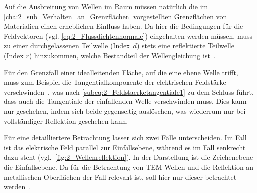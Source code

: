 Auf die Ausbreitung von Wellen im Raum müssen natürlich die im \Abschnitt\ref{cha:2_sub_Verhalten_an_Grenzflächen} vorgestellten Grenzflächen von Materialien einen erheblichen Einfluss haben. Da hier die Bedingungen für die Feldvektoren (vgl. \Gleichungen\eqref{eq:2_Flussdichtennormale}) eingehalten werden müssen, muss zu einer durchgelassenen Teilwelle \mbox{(Index \glqq$d$\grqq)} stets eine reflektierte Teilwelle (Index \glqq$r$\grqq) hinzukommen, welche Bestandteil der Wellengleichung ist~\cite{EM_Schirmung}.
\par
\vspace{\linespace}
Für den Grenzfall einer idealleitenden Fläche, auf die eine ebene Welle trifft, muss zum Beispiel die Tangentialkomponente der elektrischen Feldstärke verschwinden~\cite{EM_Schirmung}, was nach \Gleichung \eqref{subeq:2_Feldstaerketangentiale1} zu dem Schluss führt, dass auch die Tangentiale der einfallenden Welle verschwinden muss. Dies kann nur geschehen, indem sich beide gegenseitig auslöschen, was wiederrum nur bei vollständiger Reflektion geschehen kann.
\par
\vspace{\linespace}
Für eine detailliertere Betrachtung lassen sich zwei Fälle unterscheiden. Im Fall  ist das elektrische Feld parallel zur Einfallsebene, während es im Fall  senkrecht dazu steht (vgl.~\Abb \ref{fig:2_Wellenreflektion}). In der Darstellung ist die Zeichenebene die Einfallsebene. Da für die Betrachtung von TEM-Wellen und die Reflektion an metallischen Oberflächen der Fall  relevant ist, soll hier nur dieser betrachtet werden~\cite{EM_Schirmung}.
\par
\vspace{\linespace}


